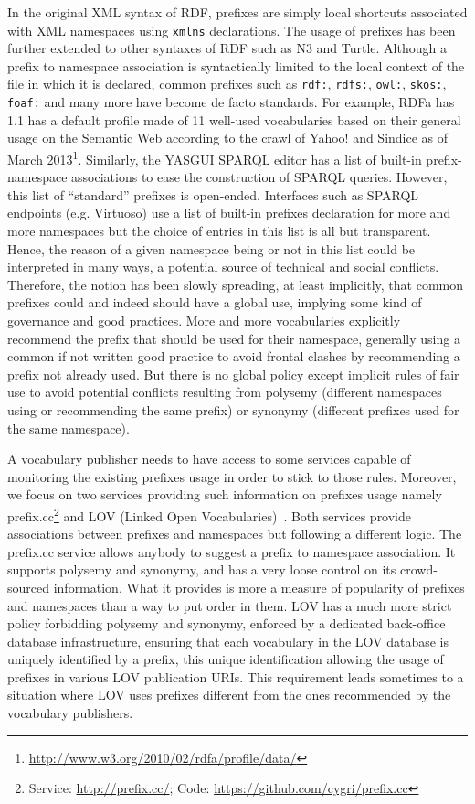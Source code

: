In the original XML syntax of RDF, prefixes are simply local shortcuts associated with XML namespaces using \texttt{xmlns} declarations. The usage of prefixes has been further extended to other syntaxes of RDF such as N3 and Turtle. Although a prefix to namespace association is syntactically limited to the local context of the file in which it is declared, common prefixes such as \texttt{rdf:}, \texttt{rdfs:}, \texttt{owl:}, \texttt{skos:}, \texttt{foaf:} and many more have become de facto standards. For example, RDFa has 1.1 has a default profile made of 11 well-used vocabularies based on their general usage on the Semantic Web according to the crawl of Yahoo! and Sindice as of March 2013\footnote{\url{http://www.w3.org/2010/02/rdfa/profile/data/}}. Similarly, the YASGUI SPARQL editor has a list of built-in prefix-namespace associations to ease the construction of SPARQL queries. However, this list of ``standard'' prefixes is open-ended. Interfaces such as SPARQL endpoints (e.g. Virtuoso) use a list of built-in prefixes declaration for more and more namespaces but the choice of entries in this list is all but transparent. Hence, the reason of a given namespace being or not in this list could be interpreted in many ways, a potential source of technical and social conflicts. Therefore, the notion has been slowly spreading, at least implicitly, that common prefixes could and indeed should have a global use, implying some kind of governance and good practices. More and more vocabularies explicitly recommend the prefix that should be used for their namespace, generally using a common if not written good practice to avoid frontal clashes by recommending a prefix not already used. But there is no global policy except implicit rules of fair use to avoid potential conflicts resulting from polysemy (different namespaces using or recommending the same prefix) or synonymy (different prefixes used for the same namespace).

A vocabulary publisher needs to have access to some services capable of monitoring the existing prefixes usage in order to stick to those rules. Moreover, we focus on two services providing such information on prefixes usage namely prefix.cc\footnote{Service: \url{http://prefix.cc/}; Code: \url{https://github.com/cygri/prefix.cc}} and LOV (Linked Open Vocabularies)~\cite{Datalift:D22}. Both services provide associations between prefixes and namespaces but following a different logic. The prefix.cc service allows anybody to suggest a prefix to namespace association. It supports polysemy and synonymy, and has a very loose control on its crowd-sourced information. What it provides is more a measure of popularity of prefixes and namespaces than a way to put order in them. LOV has a much more strict policy forbidding polysemy and synonymy, enforced by a dedicated back-office database infrastructure, ensuring that each vocabulary in the LOV database is uniquely identified by a prefix, this unique identification allowing the usage of prefixes in various LOV publication URIs. This requirement leads sometimes to a situation where LOV uses prefixes different from the ones recommended by the vocabulary publishers.

